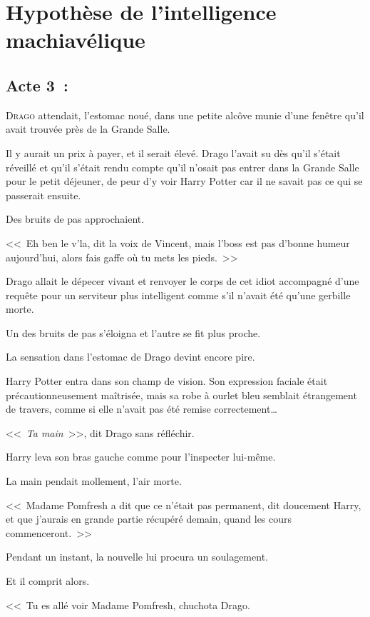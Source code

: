 \chapter{Hypothèse de l'intelligence machiavélique}

\section{Acte 3~:}

\lettrine{D}{rago} attendait, l'estomac noué, dans une petite alcôve munie d'une fenêtre qu'il avait trouvée près de la Grande Salle.

Il y aurait un prix à payer, et il serait élevé. Drago l'avait su dès qu'il s'était réveillé et qu'il s'était rendu compte qu'il n'osait pas entrer dans la Grande Salle pour le petit déjeuner, de peur d'y voir Harry Potter car il ne savait pas ce qui se passerait ensuite.

Des bruits de pas approchaient.

<<~Eh ben le v'la, dit la voix de Vincent, mais l'boss est pas d'bonne humeur aujourd'hui, alors fais gaffe où tu mets les pieds.~>>

Drago allait le dépecer vivant et renvoyer le corps de cet idiot accompagné d'une requête pour un serviteur plus intelligent comme s'il n'avait été qu'une gerbille morte.

Un des bruits de pas s'éloigna et l'autre se fit plus proche.

La sensation dans l'estomac de Drago devint encore pire.

Harry Potter entra dans son champ de vision. Son expression faciale était précautionneusement maîtrisée, mais sa robe à ourlet bleu semblait étrangement de travers, comme si elle n'avait pas été remise correctement…

<<~\emph{Ta main}~>>, dit Drago sans réfléchir.

Harry leva son bras gauche comme pour l'inspecter lui-même.

La main pendait mollement, l'air morte.

<<~Madame Pomfresh a dit que ce n'était pas permanent, dit doucement Harry, et que j'aurais en grande partie récupéré demain, quand les cours commenceront.~>>

Pendant un instant, la nouvelle lui procura un soulagement.

Et il comprit alors.

<<~Tu es allé voir Madame Pomfresh, chuchota Drago.

